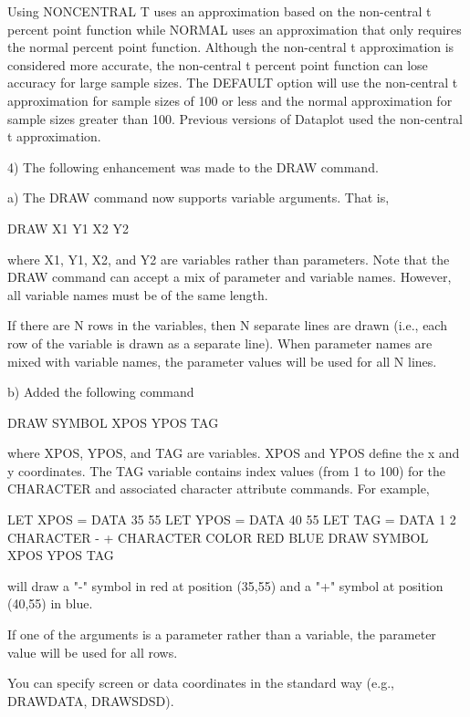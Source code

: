              Using NONCENTRAL T uses an approximation based on the
             non-central t percent point function while NORMAL uses an
             approximation that only requires the normal percent point
             function.  Although the non-central t approximation is
             considered more accurate, the non-central t percent point
             function can lose accuracy for large sample sizes.  The
             DEFAULT option will use the non-central t approximation
             for sample sizes of 100 or less and the normal approximation
             for sample sizes greater than 100.  Previous versions of
             Dataplot used the non-central t approximation.

 4) The following enhancement was made to the DRAW command.

    a) The DRAW command now supports variable arguments.  That is,

           DRAW X1 Y1 X2 Y2

       where X1, Y1, X2, and Y2 are variables rather than parameters.
       Note that the DRAW command can accept a mix of parameter and
       variable names.  However, all variable names must be of the same
       length.

       If there are N rows in the variables, then N separate lines are
       drawn (i.e., each row of the variable is drawn as a separate line).
       When parameter names are mixed with variable names, the parameter
       values will be used for all N lines.

    b) Added the following command

           DRAW SYMBOL XPOS YPOS TAG

       where XPOS, YPOS, and TAG are variables.  XPOS and YPOS define
       the x and y coordinates.  The TAG variable contains index values
       (from 1 to 100) for the CHARACTER and associated character
       attribute commands.  For example,

           LET XPOS = DATA 35 55
           LET YPOS = DATA 40 55
           LET TAG  = DATA  1  2
           CHARACTER  - +
           CHARACTER COLOR RED BLUE
           DRAW SYMBOL XPOS YPOS TAG

        will draw a "-" symbol in red at position (35,55) and a "+" symbol
        at position (40,55) in blue.

        If one of the arguments is a parameter rather than a variable, the
        parameter value will be used for all rows.

        You can specify screen or data coordinates in the standard way
        (e.g., DRAWDATA, DRAWSDSD).

